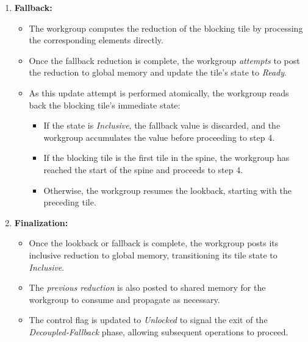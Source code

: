 \documentclass[sigconf]{acmart}
\begin{document}
\begin{enumerate}
  \item \textbf{Fallback:}
        \begin{itemize}
          \item The workgroup computes the reduction of the blocking tile by processing the corresponding elements directly.
          \item Once the fallback reduction is complete, the workgroup \emph{attempts} to post the reduction to global memory and update the tile's state to \emph{Ready}.
          \item As this update attempt is performed atomically, the workgroup reads back the blocking tile's immediate state:
                \begin{itemize}
                  \item If the state is \emph{Inclusive}, the fallback value is discarded, and the workgroup accumulates the value before proceeding to step 4.
                  \item If the blocking tile is the first tile in the spine, the workgroup has reached the start of the spine and proceeds to step 4.
                  \item Otherwise, the workgroup resumes the lookback, starting with the preceding tile.
                \end{itemize}
        \end{itemize}

  \item \textbf{Finalization:}
  \begin{itemize}
      \item Once the lookback or fallback is complete, the workgroup posts its inclusive reduction to global memory, transitioning its tile state to \emph{Inclusive}.
      \item The \emph{previous reduction} is also posted to shared memory for the workgroup to consume and propagate as necessary.
      \item The control flag is updated to \emph{Unlocked} to signal the exit of the \emph{Decoupled-Fallback} phase, allowing subsequent operations to proceed.
  \end{itemize}
\end{enumerate}
\end{document}
